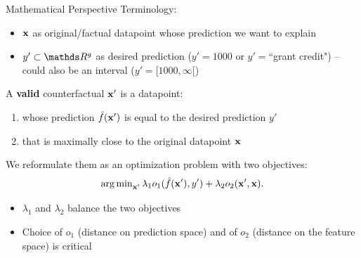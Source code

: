 \documentclass[11pt,compress,t,notes=noshow, aspectratio=169, xcolor=table]{beamer}
\begin{document}
\begin{frame}{Mathematical Perspective}
	Terminology:
	\begin{itemize}
		\item $\xv$ as original/factual datapoint whose prediction we want to explain
		\item $y' \subset \R^g$ as desired prediction ($y' = 1000$ or $y' = $``grant credit") -- could also be an interval ($y' = [1000, \infty[$)
	\end{itemize}
	\vspace{0.3cm}
	A \textbf{valid} counterfactual $\xv'$ is a datapoint:
	\begin{enumerate}
		\item whose prediction $\fh(\xv')$ is equal to the desired prediction $y'$
		\item that is maximally close to the original datapoint $\xv$
	\end{enumerate}
	We reformulate them as an optimization problem with two objectives:
	\begin{equation}
		\argmin_{\xv'} \lambda_1 o_1(\fh(\xv'), y') + \lambda_2 o_2(\xv', \xv).
		\label{eq:optim}
	\end{equation}
	\begin{itemize}
		\item $\lambda_1$ and $\lambda_2$ balance the two objectives
		\item Choice of $o_1$ (distance on prediction space) and of $o_2$ (distance on the feature space) is critical
	\end{itemize}
\end{frame}
\end{document}
